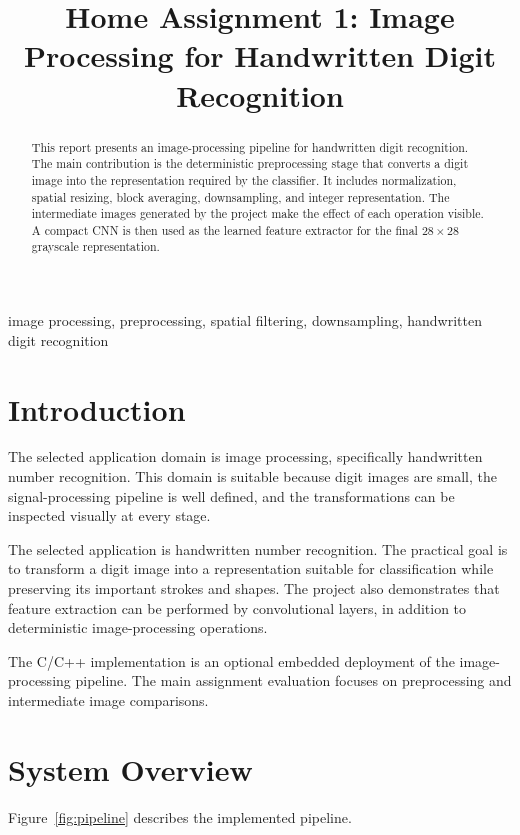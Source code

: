 \documentclass[conference]{IEEEtran}
\title{Home Assignment 1: Image Processing for Handwritten Digit Recognition}
\author{\IEEEauthorblockN{Jordán Fernández Ruiz}
\IEEEauthorblockA{UNI-ID: \texttt{262754IV}\\
Tallinn University of Technology}}
\begin{document}
\setlength{\parindent}{0pt}
\setlength{\parskip}{0.35em}
\maketitle

\begin{abstract}
This report presents an image-processing pipeline for handwritten digit recognition. The main contribution is the deterministic preprocessing stage that converts a digit image into the representation required by the classifier. It includes normalization, spatial resizing, block averaging, downsampling, and integer representation. The intermediate images generated by the project make the effect of each operation visible. A compact CNN is then used as the learned feature extractor for the final $28 \times 28$ grayscale representation.
\end{abstract}

\begin{IEEEkeywords}
image processing, preprocessing, spatial filtering, downsampling, handwritten digit recognition
\end{IEEEkeywords}

\section{Introduction}
The selected application domain is image processing, specifically handwritten number recognition. This domain is suitable because digit images are small, the signal-processing pipeline is well defined, and the transformations can be inspected visually at every stage.

The selected application is handwritten number recognition. The practical goal is to transform a digit image into a representation suitable for classification while preserving its important strokes and shapes. The project also demonstrates that feature extraction can be performed by convolutional layers, in addition to deterministic image-processing operations.

The C/C++ implementation is an optional embedded deployment of the image-processing pipeline. The main assignment evaluation focuses on preprocessing and intermediate image comparisons.

\section{System Overview}
Figure~\ref{fig:pipeline} describes the implemented pipeline.
\end{document}
